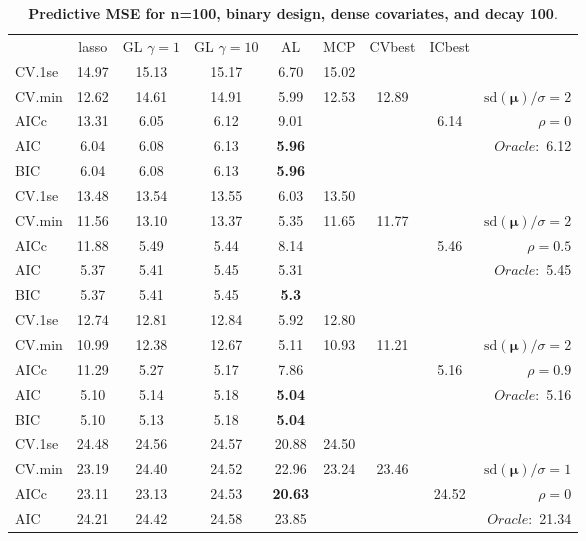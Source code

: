 \begin{table}\vspace{-.5cm}
\caption[l]{ { \bf Predictive MSE for n=100, binary design, 
dense covariates, and  decay  100}.}
\vspace{-.5cm}
\footnotesize{}
\begin{center}
\begin{tabular}{l*{7}{c}|r}
 & lasso & GL $\gamma=1$ & GL $\gamma=10$ & AL & MCP  & CVbest & ICbest  \\
\cline{1-9}
CV.1se & 14.97 & 15.13 & 15.17 & 6.70 & 15.02 & & & \\
CV.min & 12.62 & 14.61 & 14.91 & 5.99 & 12.53 & 12.89 & & $\mathrm{sd}(\mathbf{\mu})/\sigma=2$ \\
AICc & 13.31 & 6.05 & 6.12 & 9.01 & & & 6.14 &  $\rho=0$ \\
AIC & 6.04 & 6.08 & 6.13 & {\bf 5.96} & & & &  \multirow{2}{*}{$Oracle: $ 6.12} \\
BIC & 6.04 & 6.08 & 6.13 & {\bf 5.96} & & & &  \\
 \hline 
CV.1se & 13.48 & 13.54 & 13.55 & 6.03 & 13.50 & & & \\
CV.min & 11.56 & 13.10 & 13.37 & 5.35 & 11.65 & 11.77 & & $\mathrm{sd}(\mathbf{\mu})/\sigma=2$ \\
AICc & 11.88 & 5.49 & 5.44 & 8.14 & & & 5.46 &  $\rho=0.5$ \\
AIC & 5.37 & 5.41 & 5.45 & 5.31 & & & &  \multirow{2}{*}{$Oracle: $ 5.45} \\
BIC & 5.37 & 5.41 & 5.45 & {\bf 5.3} & & & &  \\
 \hline 
CV.1se & 12.74 & 12.81 & 12.84 & 5.92 & 12.80 & & & \\
CV.min & 10.99 & 12.38 & 12.67 & 5.11 & 10.93 & 11.21 & & $\mathrm{sd}(\mathbf{\mu})/\sigma=2$ \\
AICc & 11.29 & 5.27 & 5.17 & 7.86 & & & 5.16 &  $\rho=0.9$ \\
AIC & 5.10 & 5.14 & 5.18 & {\bf 5.04} & & & &  \multirow{2}{*}{$Oracle: $ 5.16} \\
BIC & 5.10 & 5.13 & 5.18 & {\bf 5.04} & & & &  \\
 \hline 
CV.1se & 24.48 & 24.56 & 24.57 & 20.88 & 24.50 & & & \\
CV.min & 23.19 & 24.40 & 24.52 & 22.96 & 23.24 & 23.46 & & $\mathrm{sd}(\mathbf{\mu})/\sigma=1$ \\
AICc & 23.11 & 23.13 & 24.53 & {\bf 20.63} & & & 24.52 &  $\rho=0$ \\
AIC & 24.21 & 24.42 & 24.58 & 23.85 & & & &  \multirow{2}{*}{$Oracle: $ 21.34} \\

\end{tabular}
\end{center}
\end{table}
